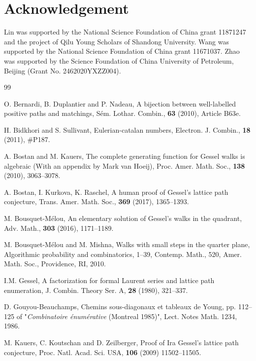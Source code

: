 \documentclass[12pt]{amsart}
\numberwithin{equation}{section}
\theoremstyle{plain}
\theoremstyle{definition}
\begin{document}
\section*{Acknowledgement}%

Lin was supported
by the National Science Foundation of China grant 11871247 and the project of Qilu Young Scholars of Shandong University. Wang  was supported by the National Science Foundation of China grant 11671037. Zhao was supported by the Science Foundation of China University of Petroleum, Beijing (Grant No. 2462020YXZZ004).





\begin{thebibliography}{99}



 O. Bernardi, B. Duplantier and P. Nadeau, A bijection between well-labelled positive paths and matchings, S\'em. Lothar. Combin., {\bf63} (2010), Article B63e.

H. Bidkhori and S. Sullivant, Eulerian-catalan numbers, Electron. J. Combin., {\bf18}  (2011), \#P187.

 A. Bostan and M. Kauers,  The complete generating function for Gessel walks is algebraic (With an appendix by Mark van Hoeij), Proc. Amer. Math. Soc., {\bf138} (2010), 3063--3078.

 A. Bostan, I. Kurkova, K. Raschel, A human proof of Gessel's lattice path conjecture, Trans. Amer. Math. Soc.,  {\bf369} (2017), 1365--1393. 

 M. Bousquet-M\'elou, An elementary solution of Gessel's walks in the quadrant, Adv. Math., {\bf303} (2016), 1171--1189.

 M. Bousquet-M\'elou and M. Mishna,  Walks with small steps in the quarter plane, Algorithmic probability and combinatorics, 1--39, Contemp. Math., 520, Amer. Math. Soc., Providence, RI, 2010. 



  I.M. Gessel, A factorization for formal Laurent series and lattice path enumeration, J. Combin.
Theory Ser. A, {\bf28} (1980), 321--337.

 D. Gouyou-Beauchamps, Chemins sous-diagonaux et tableaux de Young, pp. 112--125 of "{\em Combinatoire \'enum\'erative} (Montreal 1985)", Lect. Notes Math. 1234, 1986.

 M. Kauers, C. Koutschan and D. Zeilberger, Proof of Ira Gessel's lattice path conjecture, Proc. Natl. Acad. Sci. USA, {\bf106} (2009) 11502--11505.


\end{thebibliography}
\end{document}
